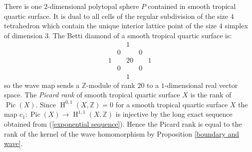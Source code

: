 \documentclass[11pt]{article}
\numberwithin{equation}{numsection}
\newcommand{\Z}{{\mathbb Z}}
\DeclareMathOperator{\Pic}{Pic}
\DeclareMathOperator{\HH}{H}
\begin{document}
There is one $2$-dimensional polytopal sphere $P$ contained in smooth tropical quartic  surface. 
It is dual to all cells of the regular subdivision of the size $4$  tetrahedron  
which contain the unique interior lattice point of the size $4$ simplex of dimension $3$. 
The Betti diamond of a  smooth tropical quartic surface is:
$$\begin{array}{ccccc} &  & 1 &  &  \\ & 0 &  & 0 &  \\1 &  & 20 &  & 1 \\  & 0 &  & 0 &   \\  &  & 1 &  & \end{array}$$
so the wave map sends a $\Z$-module of  rank $20$ to a $1$-dimensional real vector space. 
The \emph{Picard rank} of smooth tropical quartic surface $X$ is the rank of $\Pic(X)$. 
Since $\HH^{0,1}(X, \Z) = 0$ for a smooth tropical quartic  surface $X$ the map $c_1 \colon \Pic(X) \to \HH^{1, 1}(X, \Z)$ is injective by the long exact sequence obtained from (\ref{exponential sequence}). Hence the Picard rank is equal to the rank of the kernel of the wave homomorphism by Proposition \ref{boundary and wave}. 
\end{document}

